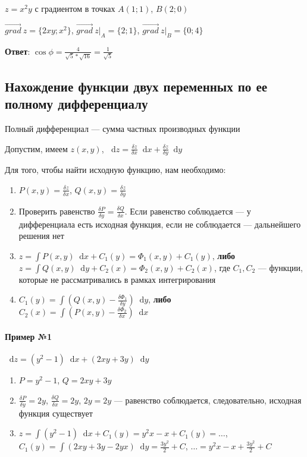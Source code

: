 \documentclass{article}
\newcommand*\diff{\mathop{}\!\mathrm{d}}
\begin{document}
$z = x^2 y$ с градиентом в точках $A (1; 1)$, $B (2; 0)$

$\vec{grad} \ z = \{ 2x y; x^2 \}$, $\vec{grad} \ z \bigg|_{A} = \{ 2; 1 \}$, $\vec{grad} \ z \bigg|_{B} = \{ 0; 4 \}$

\textbf{Ответ}: $\cos \phi = \frac{4}{\sqrt{5} * \sqrt{16}} = \frac{1}{\sqrt{5}}$

\subsection{Нахождение функции двух переменных по ее полному дифференциалу}

Полный дифференциал — сумма частных производных функции

Допустим, имеем $z(x, y)$, $\diff z = \frac{\delta z}{\delta x} \diff x + \frac{\delta z}{\delta y} \diff y$

Для того, чтобы найти исходную функцию, нам необходимо:

\begin{enumerate}
    \item $P (x, y) = \frac{\delta z}{\delta x}$, $Q (x, y) = \frac{\delta z}{\delta y}$
    \item Проверить равенство $\frac{\delta P}{\delta y} = \frac{\delta Q}{\delta x}$. Если равенство соблюдается — у дифференциала есть исходная функция, если не соблюдается — дальнейшего решения нет
    \item $z = \int P (x, y) \diff x + C_1 (y) = \Phi_1 (x, y) + C_1 (y)$, \textbf{либо} \\
    $z = \int Q(x, y) \diff y + C_2 (x) = \Phi_2 (x, y) + C_2 (x)$, где $C_1, C_2$ — функции, которые не рассматривались в рамках интегрирования
    \item $C_1 (y) = \int (Q (x, y) - \frac{\delta \Phi_1}{\delta y}) \diff y$, \textbf{либо} \\
    $C_2 (x) = \int (P(x, y) - \frac{\delta \Phi_2}{\delta x}) \diff x$
\end{enumerate}

\paragraph{Пример №1} $\diff z = (y^2 - 1) \diff x + (2 x y + 3 y) \diff y$

\begin{enumerate}
    \item $P = y^2 - 1$, $Q = 2 x y + 3 y$
    \item $\frac{\delta P}{\delta y}  = 2 y$, $\frac{\delta Q}{\delta x} = 2 y$, $2y = 2y$ — равенство соблюдается, следовательно, исходная функция существует
    \item $z = \int (y^2 - 1) \diff x + C_1(y) = y^2 x - x + C_1 (y) = \dots$, \\ $C_1 (y) = \int (2 x y + 3 y - 2 y x) \diff y = \frac{3 y^2}{2} + C$, $\dots = y^2 x - x + \frac{3 y^2}{2} + C$ 
\end{enumerate}
\end{document}
